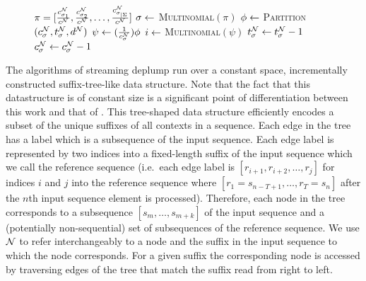 \begin{figure*}[ttt!]
\begin{minipage}[t]{.48\linewidth}
\begin{algorithm}[H]
\begin{algorithmic}[1]
			\State $\pi = [\frac{c^\N_{\sigma_1}}{c^\N}, \frac{c^\N_{\sigma_2}}{c^\N}, \ldots, \frac{c^\N_{\sigma_{|\Sigma}}}{c^\N}]$
			\State $\sigma \la $ \textsc{Multinomial}$(\pi)$ %
			\State $\phi \la$ \textsc{Partition}$(c^\N_\sigma, t^\N_\sigma, d^{\N})$
			\State $\psi \la (\frac{1}{c^\N_{\sigma}} ) \phi$
			\State $i \la$ \textsc{Multinomial}$(\psi)$
				\State $t^\N_\sigma \la t^\N_\sigma - 1$
			\EndIf
			\State $c^\N_\sigma \la c^\N_\sigma - 1$
		\EndWhile
	\EndFunction	
	\end{algorithmic}	
\end{algorithm}
	\end{minipage}
	\end{figure*}

The algorithms of streaming deplump run over a constant space, incrementally constructed suffix-tree-like data structure.  Note that the fact that this datastructure is of constant size is a significant point of  differentiation between this work and that of \cite{Gasthaus2010}. This tree-shaped data structure efficiently encodes a subset of the unique suffixes of all contexts in a sequence.  Each edge in the tree has a label which is a subsequence of the input sequence.  Each edge label is represented by two indices into a fixed-length suffix of the input sequence which we call the reference sequence (i.e.~each edge label is $[r_{i+1}, r_{i+2}, \ldots,r_{j}]$ for indices $i$ and $j$ into the reference sequence where $[r_{1} = s_{n-T+1}, \ldots, r_T = s_n]$ after the $n$th input sequence element is processed). Therefore, each node in the tree corresponds to a subsequence $[s_m, \ldots, s_{m + k}]$ of the input sequence and a (potentially non-sequential) set of subsequences of the reference sequence.  
We use $\N$ to refer interchangeably to a node and the suffix in the input sequence to which the node corresponds.  For a given suffix the corresponding node is accessed by traversing edges of the tree that match the suffix read from right to left. 
%

